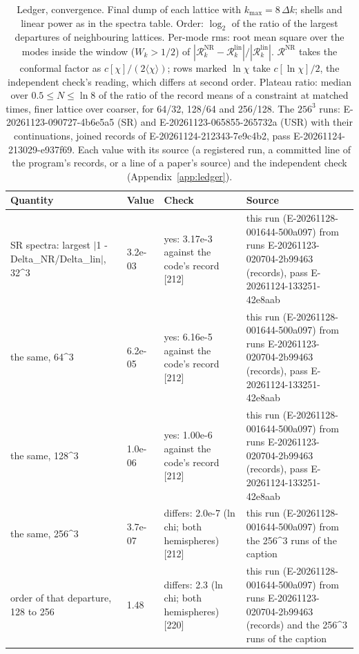 \begin{table}
\caption{Ledger, convergence. Final dump of each lattice with $k_\mathrm{max} = 8\,\Delta k$; shells and linear power as in the spectra table. Order: $\log_2$ of the ratio of the largest departures of neighbouring lattices. Per-mode rms: root mean square over the modes inside the window ($W_k > 1/2$) of $|\mathcal{R}_k^\mathrm{NR} - \mathcal{R}_k^\mathrm{lin}|/|\mathcal{R}_k^\mathrm{lin}|$. $\mathcal{R}^\mathrm{NR}$ takes the conformal factor as $c[\chi]/(2\langle\chi\rangle)$; rows marked $\ln\chi$ take $c[\ln\chi]/2$, the independent check's reading, which differs at second order. Plateau ratio: median over $0.5 \le N \le \ln 8$ of the ratio of the record means of a constraint at matched times, finer lattice over coarser, for 64/32, 128/64 and 256/128. The $256^3$ runs: E-20261123-090727-4b6e5a5 (SR) and E-20261123-065855-265732a (USR) with their continuations, joined records of E-20261124-212343-7e9c4b2, pass E-20261124-213029-e937f69. Each value with its source (a registered run, a committed line of the program's records, or a line of a paper's source) and the independent check (Appendix~\ref{app:ledger}).}
\label{tab:ledgerconvergence}
\footnotesize
\begin{tabular}{p{}p{}p{}p{}}
\toprule
Quantity & Value & Check & Source \\
\midrule
SR spectra: largest $|$1 - Delta\_NR/\allowbreak{}Delta\_lin$|$, 32\^{}3 & 3.2e-03 & yes: 3.17e-3 against the code's record [212] & this run (E-20261128-001644-500a097) from runs E-20261123-020704-2b99463 (records), pass E-20261124-133251-42e8aab \\
the same, 64\^{}3 & 6.2e-05 & yes: 6.16e-5 against the code's record [212] & this run (E-20261128-001644-500a097) from runs E-20261123-020704-2b99463 (records), pass E-20261124-133251-42e8aab \\
the same, 128\^{}3 & 1.0e-06 & yes: 1.00e-6 against the code's record [212] & this run (E-20261128-001644-500a097) from runs E-20261123-020704-2b99463 (records), pass E-20261124-133251-42e8aab \\
the same, 256\^{}3 & 3.7e-07 & differs: 2.0e-7 (ln chi; both hemispheres) [212] & this run (E-20261128-001644-500a097) from the 256\^{}3 runs of the caption \\
order of that departure, 128 to 256 & 1.48 & differs: 2.3 (ln chi; both hemispheres) [220] & this run (E-20261128-001644-500a097) from runs E-20261123-020704-2b99463 (records) and the 256\^{}3 runs of the caption \\

\end{tabular}
\end{table}
